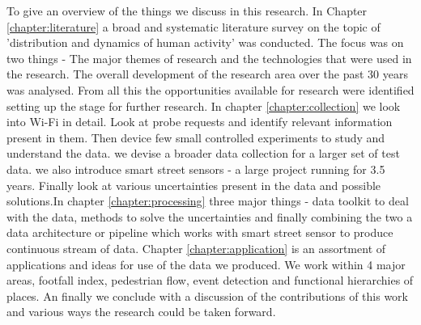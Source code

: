 To give an overview of the things we discuss in this research.
In Chapter \ref{chapter:literature} a broad and systematic literature survey on the topic of 'distribution and dynamics of human activity' was conducted.
The focus was on two things - The major themes of research and the technologies that were used in the research.
The overall development of the research area over the past 30 years was analysed.
From all this the opportunities available for research were identified setting up the stage for further research.
In chapter \ref{chapter:collection} we look into Wi-Fi in detail.
Look at probe requests and identify relevant information present in them.
Then device few small controlled experiments to study and understand the data.
 we devise a broader data collection for a larger set of test data.
we also introduce smart street sensors - a large project running for 3.5 years.
Finally look at various uncertainties present in the data and possible solutions.In chapter \ref{chapter:processing} three major things - data toolkit to deal with the data, methods to solve the uncertainties and finally combining the two a data architecture or pipeline which works with smart street sensor to produce continuous stream of data.
Chapter \ref{chapter:application} is an assortment of applications and ideas for use of the data we produced. We work within 4 major areas, footfall index, pedestrian flow, event detection and functional hierarchies of places. An finally we conclude with a discussion of the contributions of this work and various ways the research could be taken forward.

